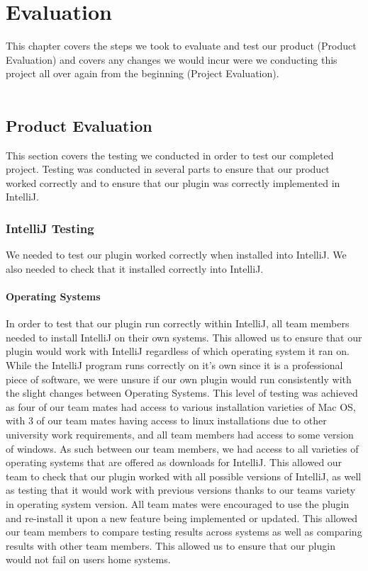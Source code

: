 \chapter{Evaluation}
\label{evaluation}

This chapter covers the steps we took to evaluate and test our product (Product Evaluation) and covers any changes we would incur were we conducting this project all over again from the beginning (Project Evaluation).\\
\\
\section{Product Evaluation}
This section covers the testing we conducted in order to test our completed project. Testing was conducted in several parts to ensure that our product worked correctly and to ensure that our plugin was correctly implemented in IntelliJ.

\subsection{IntelliJ Testing}
We needed to test our plugin worked correctly when installed into IntelliJ. We also needed to check that it installed correctly into IntelliJ. \\

\subsubsection{Operating Systems}
In order to test that our plugin run correctly within IntelliJ, all team members needed to install IntelliJ on their own systems. This allowed us to ensure that our plugin would work with IntelliJ regardless of which operating system it ran on. While the IntelliJ program runs correctly on it's own since it is a professional piece of software, we were unsure if our own plugin would run consistently with the slight changes between Operating Systems. This level of testing was achieved as four of our team mates had access to various installation varieties of Mac OS, with 3 of our team mates having access to linux installations due to other university work requirements, and all team members had access to some version of windows. As such between our team members, we had access to all varieties of operating systems that are offered as downloads for IntelliJ. This allowed our team to check that our plugin worked with all possible versions of IntelliJ, as well as testing that it would work with previous versions thanks to our teams variety in operating system version. All team mates were encouraged to use the plugin and re-install it upon a new feature being implemented or updated. This allowed our team members to compare testing results across systems as well as comparing results with other team members. This allowed us to ensure that our plugin would not fail on users home systems.\\
\\
